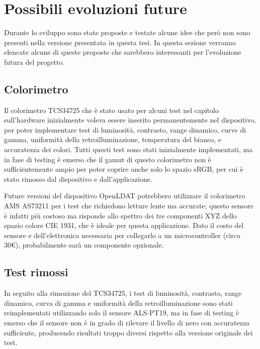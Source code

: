 \section{Possibili evoluzioni future}
Durante lo sviluppo sono state proposte e testate alcune idee che però non sono presenti nella versione presentata in questa tesi. In questa sezione verranno elencate alcune di queste proposte che sarebbero interessanti per l'evoluzione futura del progetto.

\subsection{Colorimetro}
Il colorimetro TCS34725 che è stato usato per alcuni test nel capitolo sull'hardware inizialmente voleva essere inserito permanentemente nel dispositivo, per poter implementare test di luminosità, contrasto, range dinamico, curve di gamma, uniformità della retroilluminazione, temperatura del bianco, e accuratezza dei colori. Tutti questi test sono stati inizialmente implementati, ma in fase di testing è emerso che il gamut di questo colorimetro non è sufficientemente ampio per poter coprire anche solo lo spazio sRGB, per cui è stato rimosso dal dispositivo e dall'applicazione.

Future versioni del dispositivo OpenLDAT potrebbero utilizzare il colorimetro AMS AS73211 per i test che richiedono letture lente ma accurate; questo sensore è infatti più costoso ma risponde allo spettro dei tre componenti XYZ dello spazio colore CIE 1931, che è ideale per questa applicazione. Dato il costo del sensore e dell'elettronica necessaria per collegarlo a un microcontroller (circa 30€), probabilmente sarà un componente opzionale.

\subsection{Test rimossi}
In seguito alla rimozione del TCS34725, i test di luminosità, contrasto, range dinamico, curva di gamma e uniformità della retroilluminazione sono stati reimplementati utilizzando solo il sensore ALS-PT19, ma in fase di testing è emerso che il sensore non è in grado di rilevare il livello di nero con accuratezza sufficiente, producendo risultati troppo diversi rispetto alla versione originale dei test.

